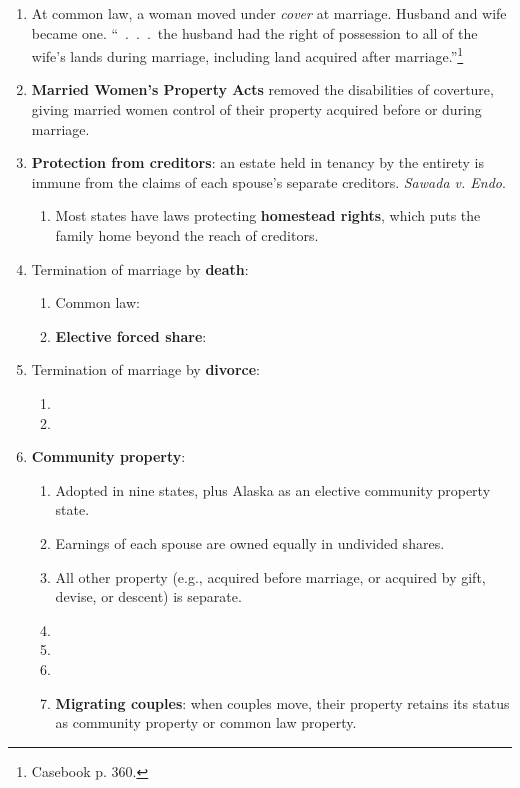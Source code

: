 \begin{enumerate}
    \item At common law, a woman moved under \emph{cover} at marriage. Husband 
    and wife became one. ``~.~.~.~the husband had the right of possession to 
    all of the wife's lands during marriage, including land acquired after 
    marriage.''\footnote{Casebook p. 360.}
    \item \textbf{Married Women's Property Acts} removed the disabilities of 
    coverture, giving married women control of their property acquired before 
    or during marriage.
    \item \textbf{Protection from creditors}:  an estate held in tenancy by 
    the entirety is immune from the claims of each spouse's separate 
    creditors. \emph{Sawada v. Endo}.
    \begin{enumerate}
        \item Most states have laws protecting \textbf{homestead rights}, 
        which puts the family home beyond the reach of creditors.
    \end{enumerate}
    \item Termination of marriage by \textbf{death}:
    \begin{enumerate}
        \item Common law: %
        \item \textbf{Elective forced share}: %
    \end{enumerate}
    \item Termination of marriage by \textbf{divorce}:
    \begin{enumerate}
        \item %
        \item %
    \end{enumerate}
    \item \textbf{Community property}:
    \begin{enumerate}
        \item Adopted in nine states, plus Alaska as an elective community 
        property state.
        \item Earnings of each spouse are owned equally in undivided shares.
        \item All other property (e.g., acquired before marriage, or acquired 
        by gift, devise, or descent) is separate.
        \item %
        \item %
        \item %
        \item \textbf{Migrating couples}: when couples move, their property 
        retains its status as community property or common law property.
    \end{enumerate}
\end{enumerate}

